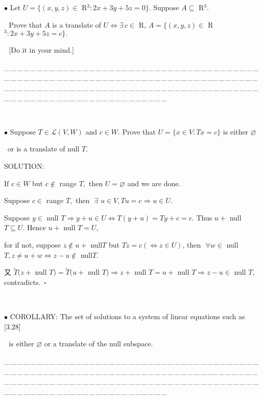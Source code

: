 \documentclass[a4paper, 11pt, UTF8]{article}
\def\Lm{\mathcal{L}}
\begin{document}
\begin{large}
{\small $\bullet$} {\timessl\Large
Let $U=\{(x,y,z)\in$ {\timesbf R}$^3:2x+3y+5z=0\}.$ Suppose $A\subseteq$ {\timesbf R}$^3$.}\par\,\,
{\timessl\Large Prove that $A$ is a translate of $U\Longleftrightarrow\exists\,c\in$ {\timesbf R}, $A=\{(x,y,z)\in$ {\timesbf R}$^3:2x+3y+5z=c\}.$}\par\,\, [{\timessl\Large Do it in your mind.}]\par
{\tiny \_\,\_\,\_\,\_\,\_\,\_\,\_\,\_\,\_\,\_\,\_\,\_\,\_\,\_\,\_\,\_\,\_\,\_\,\_\,\_\,\_\,\_\,\_\,\_\,\_\,\_\,\_\,\_\,\_\,\_\,\_\,\_\,\_\,\_\,\_\,\_\,\_\,\_\,\_\,\_\,\_\,\_\,\_\,\_\,\_\,\_\,\_\,\_\,\_\,\_\,\_\,\_\,\_\,\_\,\_\,\_\,\_\,\_\,\_\,\_\,\_\,\_\,\_\,\_\,\_\,\_\,\_\,\_\,\_\,\_\,\_\_\,\_\,\_\,\_\,\_\,\_\,\_\,\_\,\_\,\_\,\_\,\_\,\_\,\_\,\_\,\_\,\_\,\_\,\_\,\_\,\_\,\_\,\_\,\_\,\_\,\_\,\_\,\_\,\_\,\_\,\_\,\_\,\_\,\_\,\_\,\_\,\_\,\_\,\_\,\_\,\_\,\_\,\_\,\_\,\_\,\_\,\_\,\_\,\_\,\_\,\_\,\_\,\_\,\_\,\_\,\_\,\_\,\_\,\_\,\_\,\_\,\_\,\_\,\_\,\_\,\_\,\_\,\_\,\_\,\_\,\_}{\tiny\,\par}
{\small $\bullet$} {\timessl\Large Suppose $T\in\Lm(V,W)$ and $c\in W$. Prove that $U=\{x\in V:Tx=c\}$ is either $\varnothing$}\par\,\,\,{\timessl\Large or is a translate of null $T$.}\par
{\timesbf S\footnotesize{OLUTION:}}\par\quad
If $c\in W$ but $c\not\in$ range $T,$ then $U=\varnothing$ and we are done.\par\quad
Suppose $c\in$ range $T,$ then $\,\,\exists\,\,u\in V,Tu=c\Rightarrow u\in U.$\par\quad
Suppose $y\in$ null $T\Rightarrow y+u\in U \Longleftrightarrow T(y+u)=Ty+c=c.$ Thus $u+$ null $T\subseteq U$. Hence $u+$ null $T=U$,\par\qquad
for if not, suppose $z\not\in u+$ null$T$ but $Tz=c(\Leftrightarrow z\in U)$, then $\,\,\forall w\in$ null $T,z\neq u+w\Leftrightarrow z-u\not\in$ null$T$.\par\qquad
又 $\tilde{T}(z+$ null $T)=\tilde{T}(u+$ null $T)\Rightarrow z+$ null $T=u+$ null $T\Rightarrow z-u\in$ null $T$, contradicts.$\,\,\,\square$\par{\tiny{\,}\par}
{\small $\bullet$}  {\timesbf C\small{OROLLARY:}} {\timessl\Large The set of solutions to a system of linear equations such as [3.28]}\par\qquad\qquad\qquad\,\,\,\,{\timessl\Large is either $\varnothing$ or a translate of the null subspace.}\par
{\tiny \_\,\_\,\_\,\_\,\_\,\_\,\_\,\_\,\_\,\_\,\_\,\_\,\_\,\_\,\_\,\_\,\_\,\_\,\_\,\_\,\_\,\_\,\_\,\_\,\_\,\_\,\_\,\_\,\_\,\_\,\_\,\_\,\_\,\_\,\_\,\_\,\_\,\_\,\_\,\_\,\_\,\_\,\_\,\_\,\_\,\_\,\_\,\_\,\_\,\_\,\_\,\_\,\_\,\_\,\_\,\_\,\_\,\_\,\_\,\_\,\_\,\_\,\_\,\_\,\_\,\_\,\_\,\_\,\_\,\_\,\_\_\,\_\,\_\,\_\,\_\,\_\,\_\,\_\,\_\,\_\,\_\,\_\,\_\,\_\,\_\,\_\,\_\,\_\,\_\,\_\,\_\,\_\,\_\,\_\,\_\,\_\,\_\,\_\,\_\,\_\,\_\,\_\,\_\,\_\,\_\,\_\,\_\,\_\,\_\,\_\,\_\,\_\,\_\,\_\,\_\,\_\,\_\,\_\,\_\,\_\,\_\,\_\,\_\,\_\,\_\,\_\,\_\,\_\,\_\,\_\,\_\,\_\,\_\,\_\,\_\,\_\,\_\,\_\,\_\,\_\,\_}{\tiny\,\par}


\end{large}
\end{document}
